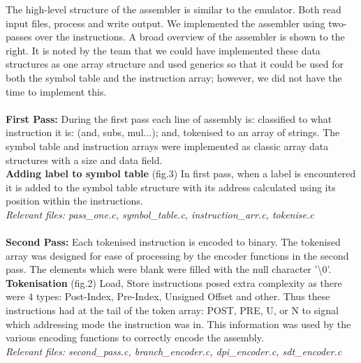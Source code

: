 \documentclass[11pt]{article}
\begin{document}
The high-level structure of the assembler is similar to the emulator. Both read input files, process and write output. We implemented the assembler using two-passes over the instructions. A broad overview of the assembler is shown to the right.  It is noted by the team that we could have implemented these data structures as one array structure and used generics so that it could be used for both the symbol table and the instruction array; however, we did not have the time to implement this.\\\\
\textbf{First Pass:} During the first pass each line of assembly is: classified to what instruction it is: (and, subs, mul...); and, tokenised to an array of strings. The symbol table and instruction arrays were implemented as classic array data structures with a size and data field.\\
\textbf{Adding label to symbol table} (fig.3) In first pass, when a label is encountered it is added to the symbol table structure with its address calculated using its position within the instructions.\\
\textit{Relevant files: pass\_one.c, symbol\_table.c, instruction\_arr.c, tokenise.c}\\
\\
\textbf{Second Pass:} Each tokenised instruction is encoded to binary. The tokenised array was designed for ease of processing by the encoder functions in the second pass. The elements which were blank were filled with the null character '\textbackslash0'.
\\
\textbf{Tokenisation} (fig.2) Load, Store instructions posed extra complexity as there were 4 types: Post-Index, Pre-Index, Unsigned Offset and other. Thus these instructions had at the tail of the token array: POST, PRE, U, or N to signal which addressing mode the instruction was in. This information was used by the various encoding functions to correctly encode the assembly.\\
\textit{Relevant files: second\_pass.c, branch\_encoder.c, dpi\_encoder.c, sdt\_encoder.c}\\
\\
\end{document}
